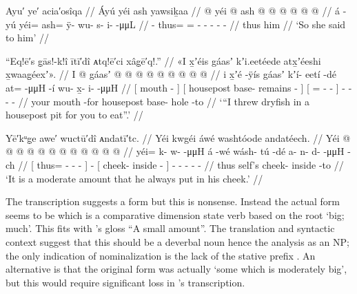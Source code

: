\ex\label{ex:90-11-so-she-said}%
%
\begingl
	\glpreamble	Ayu′ ye′ acia′osîqa //
	\glpreamble	Áyú yéi ash yawsiḵaa //
	\gla	{} @ {}
		yéi @ ash @  @ {} @ {} @ {} @ {} @ {} //
	\glb	á -yú
		yéi= ash= ÿ- wu- s- i-  -μμL //
	\glc	{} -
		thus= = - - - -  - //
	\gld	{} {}
		thus him  {} {} {} {} {} //
	\glft	‘So she said to him’
		//
\endgl
\xe

\ex\label{ex:90-12-i-threw-dryfish}%
%
\begingl
	\glpreamble	“Eq!ē′s g̣ās!-k!î ītī′dî ᴀtq!ē′ci xâg̣ē′q!.” //
	\glpreamble	«\!I x̱ʼéis gáasʼ kʼi.eetéede atx̱ʼéeshi x̱waag̱éexʼ\!». //
	\gla	{} I  @ {} {}
		{} gáasʼ  @ {} @ {} {}
		{}  @ {} @ {} @ {} {}
		 @ {} @ {} @ {} @ {} //
	\glb	{} i x̱ʼé -ÿís {}
		{} gáasʼ kʼí- eetí -dé {}
		{} at=  -μμH -í {}
		wu- x̱- i-  -μμH //
	\glc	{}[  mouth - {}]
		{}[ housepost base- remains - {}]
		{}[ =  - - {}]
		- - -  - //
	\gld	{} your mouth -for {}
		{} housepost base- hole -to {}
		{}  {} {} {} {}
		 {} {} {} {} //
	\glft	‘“I threw dryfish in a housepost pit for you to eat”.’
		//
\endgl
\xe

\ex\label{ex:90-13-small-piece-in-cheek}%
%
\begingl
	\glpreamble	Yē′kᵘg̣e awe′ wuctū′dî ᴀndatī′tc. //
	\glpreamble	Yéi kwgéi áwé washtóode andatéech. //
	\gla	{} Yéi @  @ {} @ {} @ {} {}
		 @ {}
		{} {}  @ {} @ {} {}
		 @ {} @ {} @ {} @ {} @ {}  //
	\glb	{} yéi= k- w-  -μμH {}
		á -wé
		{} {} wásh- tú -dé {}
		a- n- d-  -μμH -ch //
	\glc	{}[ thus= - -  - {}]
		 -
		{}[  cheek- inside - {}]
		- - -  - - //
	\gld	{} thus  {} {} {} {}
		 {}
		{} self’s cheek- inside -to {}
		 {} {} {} {} {} //
	\glft	‘It is a moderate amount that he always put in his cheek.’
		//
\endgl
\xe

The transcription  suggests a form  but this is nonsense.
Instead the actual form seems to be  which is a comparative dimension state verb based on the root  ‘big; much’.
This fits with \citeauthor{swanton:1909}’s gloss “A small amount”.
The translation and syntactic context suggest that this should be a deverbal noun hence the analysis as an NP; the only indication of nominalization is the lack of the stative prefix .
An alternative is that the original form was actually  ‘some which is moderately big’, but this would require significant loss in \citeauthor{swanton:1909}’s transcription.

